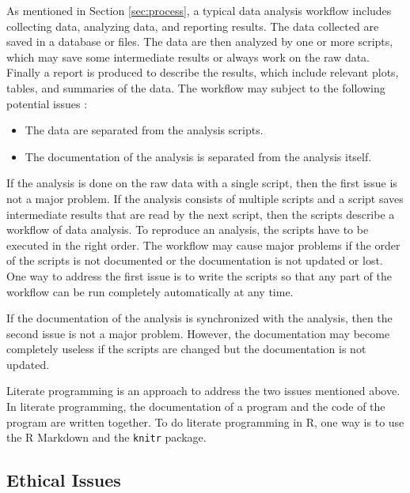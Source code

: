\documentclass[12pt]{article}
\begin{document}
As mentioned in Section \ref{sec:process}, a typical data analysis workflow includes collecting data, analyzing data, and reporting results. The data collected are saved in a database or files. The data are then analyzed by one or more scripts, which may save some intermediate results or always work on the raw data. Finally a report is produced to describe the results, which include relevant plots, tables, and summaries of the data. The workflow may subject to the following potential issues \citep[Chapter 2]{mailund2017}:
\begin{itemize}
\item The data are separated from the analysis scripts.
\item The documentation of the analysis is separated from the analysis itself. 
\end{itemize} 

If the analysis is done on the raw data with a single script, then the first issue is not a major problem. If the analysis consists of multiple scripts and a script saves intermediate results that are read by the next script, then the scripts describe a workflow of data analysis. To reproduce an analysis, the scripts have to be executed in the right order. The workflow may cause major problems if the order of the scripts is not documented or the documentation is not updated or lost. One way to address the first issue is to write the scripts so that any part of the workflow can be run completely automatically at any time.

If the documentation of the analysis is synchronized with the analysis, then the second issue is not a major problem. However, the documentation may become completely useless if the scripts are changed but the documentation is not updated.

Literate programming is an approach to address the two issues mentioned above. In literate programming, the documentation of a program and the code of the program are written together. To do literate programming in R, one way is to use the R Markdown and the \texttt{knitr} package.

\subsection{Ethical Issues}
\end{document}
